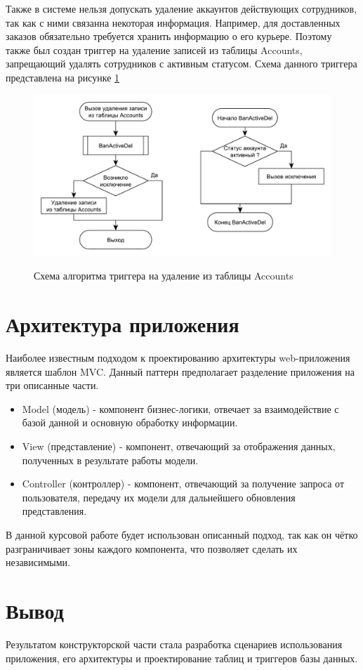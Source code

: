 Также в системе нельзя допускать удаление аккаунтов действующих сотрудников, так как с ними связанна некоторая информация. Например, для доставленных заказов обязательно требуется хранить информацию о его курьере. Поэтому также был создан триггер на удаление записей из таблицы Accounts, запрещающий удалять сотрудников с активным статусом. Схема данного триггера представлена на рисунке \ref{acc_trig}
\begin{figure}[h!]
	\begin{center}
		{\includegraphics[scale=0.4, angle=0]{sql_schemes/acc}}
		\caption{Схема алгоритма триггера на удаление из таблицы Accounts}
		\label{acc_trig}
	\end{center}
\end{figure}


\section{Архитектура приложения}
Наиболее известным подходом к проектированию архитектуры web-приложения является шаблон MVC. Данный паттерн предполагает разделение приложения на три описанные части.
\begin{itemize}
	\item Model (модель) - компонент бизнес-логики, отвечает за взаимодействие с базой данной и основную обработку информации.
	\item View (представление) - компонент, отвечающий за отображения данных, полученных в результате работы модели.
	\item Controller (контроллер) - компонент, отвечающий за получение запроса от пользователя, передачу их модели для дальнейшего обновления представления.
\end{itemize}

В данной курсовой работе будет использован описанный подход, так как он чётко разграничивает зоны каждого компонента, что позволяет сделать их независимыми.


\section*{Вывод}
Результатом конструкторской части стала разработка сценариев использования приложения, его архитектуры и проектирование таблиц и триггеров базы данных.



